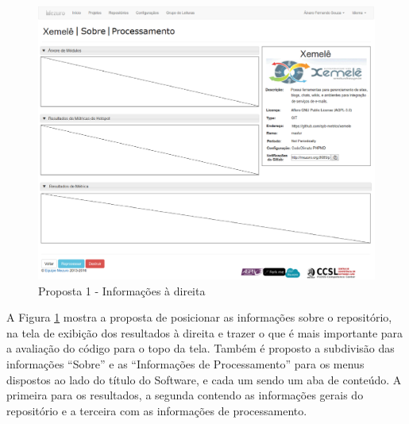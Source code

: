 \begin{figure}[!htb]
	\centering
    \includegraphics[keepaspectratio=true,scale=0.45]
    {figuras/mezuro-repositorio-view-about-right.eps}
  \caption{Proposta 1 - Informações à direita}
  \label{fig:mezuro-repositorio-view-about-right}
\end{figure}

\newpage

A Figura \ref{fig:mezuro-repositorio-view-about-right} mostra a proposta de
posicionar as informações sobre o repositório, na tela de exibição dos
resultados à direita e trazer o que é mais importante para a avaliação do código
para o topo da tela. Também é proposto a subdivisão das informações ``Sobre''
e as ``Informações de Processamento'' para os menus dispostos ao lado do título
do Software, e cada um sendo um aba de conteúdo. A primeira para os resultados,
a segunda contendo as informações gerais do repositório e a terceira com as
informações de processamento.

